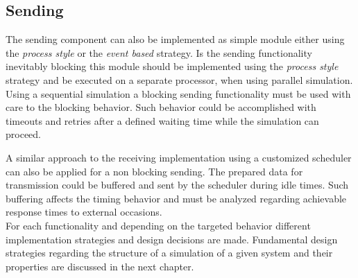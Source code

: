 \subsection{Sending}
\label{sec:emulation_communication_sending}
The sending component can also be implemented as simple module either using the \emph{process style} or the \emph{event based} strategy.
Is the sending functionality inevitably blocking this module should be implemented using the \emph{process style} strategy and be executed on a separate processor, when using parallel simulation.
Using a sequential simulation a blocking sending functionality must be used with care to the blocking behavior.
Such behavior could be accomplished with timeouts and retries after a defined waiting time while the simulation can proceed.

A similar approach to the receiving implementation using a customized scheduler can also be applied for a non blocking sending.
The prepared data for transmission could be buffered and sent by the scheduler during idle times.
Such buffering affects the timing behavior and must be analyzed regarding achievable response times to external occasions.
\\

For each functionality and depending on the targeted behavior different implementation strategies and design decisions are made.
Fundamental design strategies regarding the structure of a simulation of a given system and their properties are discussed in the next chapter.
